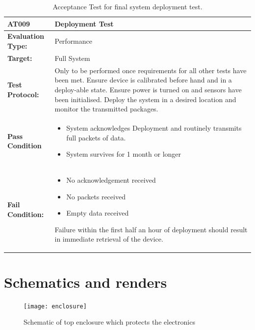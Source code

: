 \begin{table}[H]
	\centering
	\caption{Acceptance Test for final system deployment test.}
	\begin{tabular}{|m{}|m{}|}
		\hline
		\textbf{AT009 }& \textbf{Deployment Test} \\
		\hline
		\textbf{Evaluation Type:} & Performance\\
		\hline
		\textbf{Target: } & Full System \\
		\hline
		\textbf{Test Protocol:} & Only to be performed once requirements for all other tests have been met. Ensure device is calibrated before hand and in a deploy-able state. Ensure power is turned on and sensors have been initialised. Deploy the system in a desired location and monitor the transmitted packages. \\
		\hline
		\textbf{Pass Condition} & \vspace{5pt} \begin{itemize}
			\item System acknowledges Deployment and routinely transmits full packets of data.
			\item System survives for 1 month or longer
		\end{itemize} \\
		\hline
		\textbf{Fail Condition:} & \vspace{5pt} \begin{itemize}
			\item No acknowledgement received
			\item No packets received
			\item Empty data received
		\end{itemize}
		Failure within the first half an hour of deployment should result in immediate retrieval of the device.\\
		\hline
	\end{tabular}
	\label{tab:AT009}
\end{table}


\section{Schematics and renders}
\label{app:appendix.schem}

\begin{figure}[H]
    \centering
\texttt{[image: enclosure]}
    \caption{Schematic of top enclosure which protects the electronics}
    \label{fig:top_schem}
\end{figure}


